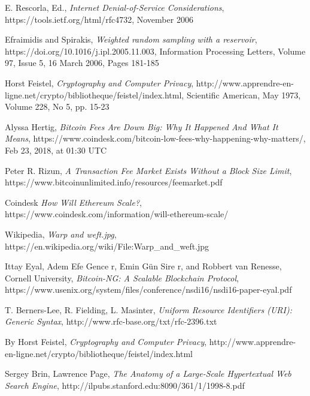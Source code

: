 \documentclass{article}
\begin{document}
\begin{thebibliography}{1}
    E. Rescorla, Ed.,
    \textit{Internet Denial-of-Service Considerations},
    https://tools.ietf.org/html/rfc4732,
    November 2006

    Efraimidis and Spirakis,
    \textit{Weighted random sampling with a reservoir},
    https://doi.org/10.1016/j.ipl.2005.11.003,
    Information Processing Letters,
    Volume 97, Issue 5, 16 March 2006, Pages 181-185

    Horst Feistel,
    \textit{Cryptography and Computer Privacy},
    http://www.apprendre-en-ligne.net/crypto/bibliotheque/feistel/index.html,
    Scientific American, May 1973, Volume 228, No 5, pp. 15-23

    Alyssa Hertig,
    \textit{Bitcoin Fees Are Down Big: Why It Happened And What It Means},
    https://www.coindesk.com/bitcoin-low-fees-why-happening-why-matters/,
    Feb 23, 2018, at 01:30 UTC

    Peter R. Rizun,
    \textit{A Transaction Fee Market Exists Without a Block Size Limit},
    https://www.bitcoinunlimited.info/resources/feemarket.pdf

    Coindesk
    \textit{How Will Ethereum Scale?},
    https://www.coindesk.com/information/will-ethereum-scale/

    Wikipedia,
    \textit{Warp and weft.jpg},
    https://en.wikipedia.org/wiki/File:Warp\_and\_weft.jpg

    Ittay Eyal, Adem Efe Gence r, Emin Gün Sire r, and Robbert van Renesse, Cornell University,
    \textit{Bitcoin-NG: A Scalable Blockchain Protocol},
    https://www.usenix.org/system/files/conference/nsdi16/nsdi16-paper-eyal.pdf

    T. Berners-Lee, R. Fielding, L. Masinter,
    \textit{Uniform Resource Identifiers (URI): Generic Syntax},
    http://www.rfc-base.org/txt/rfc-2396.txt

    By Horst Feistel,
    \textit{Cryptography and Computer Privacy},
    http://www.apprendre-en-ligne.net/crypto/bibliotheque/feistel/index.html

    Sergey Brin, Lawrence Page,
    \textit{The Anatomy of a Large-Scale Hypertextual
Web Search Engine},
    http://ilpubs.stanford.edu:8090/361/1/1998-8.pdf

\end{thebibliography}
\end{document}
